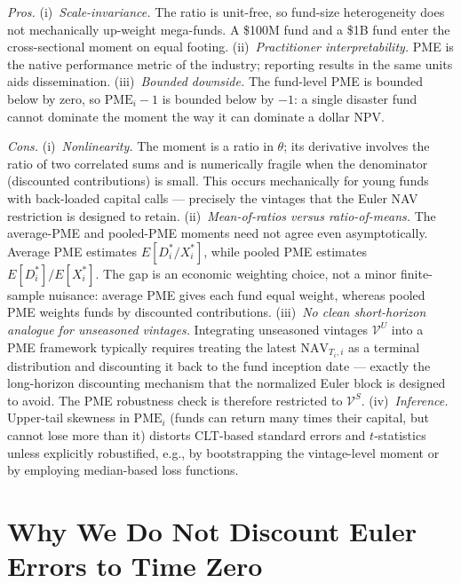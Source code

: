 \documentclass[11pt]{article}
\begin{document}
\emph{Pros.}
(i)~\emph{Scale-invariance.} The ratio is unit-free, so fund-size
heterogeneity does not mechanically up-weight mega-funds. A \$100M fund and
a \$1B fund enter the cross-sectional moment on equal footing.
(ii)~\emph{Practitioner interpretability.} PME is the native performance
metric of the industry; reporting results in the same units aids
dissemination.
(iii)~\emph{Bounded downside.} The fund-level PME is bounded below by zero,
so \(\mathrm{PME}_i-1\) is bounded below by \(-1\): a single disaster fund
cannot dominate the moment the way it can dominate a dollar NPV.

\emph{Cons.}
(i)~\emph{Nonlinearity.} The moment is a ratio in \(\theta\); its derivative
involves the ratio of two correlated sums and is numerically fragile when
the denominator (discounted contributions) is small. This occurs
mechanically for young funds with back-loaded capital calls --- precisely
the vintages that the Euler NAV restriction is designed to retain.
(ii)~\emph{Mean-of-ratios versus ratio-of-means.} The average-PME and
pooled-PME moments need not agree even asymptotically. Average PME estimates
\(E[D_i^\ast/X_i^\ast]\), while pooled PME estimates
\(E[D_i^\ast]/E[X_i^\ast]\). The gap is an economic weighting choice, not a
minor finite-sample nuisance: average PME gives each fund equal weight,
whereas pooled PME weights funds by discounted contributions.
(iii)~\emph{No clean short-horizon analogue for unseasoned vintages.}
Integrating unseasoned vintages \(\mathcal V^U\) into a PME framework typically
requires treating the latest \(\mathrm{NAV}_{T_i,i}\) as a terminal distribution
and discounting it back to the fund inception date --- exactly the
long-horizon discounting mechanism that the normalized Euler block is designed
to avoid. The PME robustness check is therefore restricted to \(\mathcal V^S\).
(iv)~\emph{Inference.} Upper-tail skewness in \(\mathrm{PME}_i\) (funds can
return many times their capital, but cannot lose more than it) distorts
CLT-based standard errors and \(t\)-statistics unless explicitly
robustified, e.g., by bootstrapping the vintage-level moment or by employing
median-based loss functions.

\section{Why We Do Not Discount Euler Errors to Time Zero}
\label{app:no_discount_to_zero}
\end{document}
